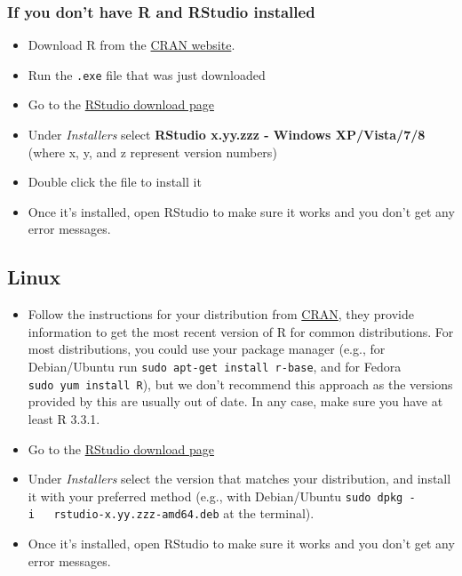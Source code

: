 \documentclass[]{book}
\providecommand{\tightlist}{%
  \setlength{\itemsep}{0pt}\setlength{\parskip}{0pt}}
\begin{document}
\subsubsection*{If you don't have R and RStudio
installed}\label{if-you-dont-have-r-and-rstudio-installed-1}

\begin{itemize}
\tightlist
\item
  Download R from the
  \href{http://cran.r-project.org/bin/windows/base/release.htm}{CRAN
  website}.
\item
  Run the \texttt{.exe} file that was just downloaded
\item
  Go to the
  \href{https://www.rstudio.com/products/rstudio/download/\#download}{RStudio
  download page}
\item
  Under \emph{Installers} select \textbf{RStudio x.yy.zzz - Windows
  XP/Vista/7/8} (where x, y, and z represent version numbers)
\item
  Double click the file to install it
\item
  Once it's installed, open RStudio to make sure it works and you don't
  get any error messages.
\end{itemize}

\subsection*{Linux}\label{linux}

\begin{itemize}
\tightlist
\item
  Follow the instructions for your distribution from
  \href{https://cloud.r-project.org/bin/linux}{CRAN}, they provide
  information to get the most recent version of R for common
  distributions. For most distributions, you could use your package
  manager (e.g., for Debian/Ubuntu run
  \texttt{sudo\ apt-get\ install\ r-base}, and for Fedora
  \texttt{sudo\ yum\ install\ R}), but we don't recommend this approach
  as the versions provided by this are usually out of date. In any case,
  make sure you have at least R 3.3.1.
\item
  Go to the
  \href{https://www.rstudio.com/products/rstudio/download/\#download}{RStudio
  download page}
\item
  Under \emph{Installers} select the version that matches your
  distribution, and install it with your preferred method (e.g., with
  Debian/Ubuntu \texttt{sudo\ dpkg\ -i\ \ \ rstudio-x.yy.zzz-amd64.deb}
  at the terminal).
\item
  Once it's installed, open RStudio to make sure it works and you don't
  get any error messages.
\end{itemize}
\end{document}
